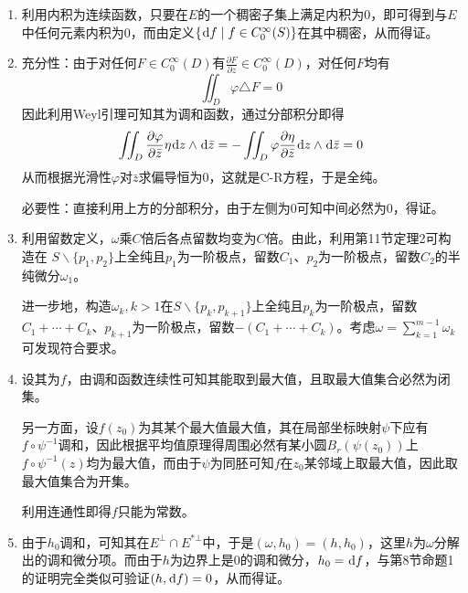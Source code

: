 \documentclass[a4paper,UTF8,fontset=windows,10pt]{ctexart}
\newcommand*{\dr}{\hspace{0.07em}\mathrm{d}}
\begin{document}
\begin{enumerate}
    \item 利用内积为连续函数，只要在$E$的一个稠密子集上满足内积为0，即可得到与$E$中任何元素内积为0，而由定义$\{\dr f\mid f\in C_0^\infty(S)\}$在其中稠密，从而得证。

    \item 充分性：由于对任何$F\in C_0^\infty(D)$有$\frac{\partial F}{\partial z}\in C_0^\infty(D)$，对任何$F$均有
    $$\iint_D\varphi\triangle F=0$$
    因此利用Weyl引理可知其为调和函数，通过分部积分即得
    $$\iint_D\frac{\partial\varphi}{\partial\bar{z}}\eta\dr z\wedge\dr\bar{z}=-\iint_D\varphi\frac{\partial\eta}{\partial\bar{z}}\dr z\wedge\dr\bar{z}=0$$
    从而根据光滑性$\varphi$对$\bar{z}$求偏导恒为0，这就是C-R方程，于是全纯。

    必要性：直接利用上方的分部积分，由于左侧为0可知中间必然为0，得证。
    

    \item 利用留数定义，$\omega$乘$C$倍后各点留数均变为$C$倍。由此，利用第11节定理2可构造在
    $S\backslash\{p_1,p_2\}$上全纯且$p_1$为一阶极点，留数$C_1$、$p_2$为一阶极点，留数$C_2$的半纯微分$\omega_1$。

    进一步地，构造$\omega_k,k>1$在$S\backslash\{p_k,p_{k+1}\}$上全纯且$p_k$为一阶极点，留数$C_1+\cdots+C_k$、$p_{k+1}$为一阶极点，留数$-(C_1+\cdots+C_k)$。考虑$\omega=\sum_{k=1}^{m-1}\omega_k$可发现符合要求。
    
    \item 设其为$f$，由调和函数连续性可知其能取到最大值，且取最大值集合必然为闭集。
    
    另一方面，设$f(z_0)$为其某个最大值最大值，其在局部坐标映射$\psi$下应有$f\circ\psi^{-1}$调和，因此根据平均值原理得周围必然有某小圆$B_r(\psi(z_0))$上$f\circ\psi^{-1}(z)$均为最大值，而由于$\psi$为同胚可知$f$在$z_0$某邻域上取最大值，因此取最大值集合为开集。
    
    利用连通性即得$f$只能为常数。

    \item 由于$h_0$调和，可知其在$E^\bot\cap E^{*\bot}$中，于是$(\omega,h_0)=(h,h_0)$，这里$h$为$\omega$分解出的调和微分项。而由于$h$为边界上是0的调和微分，$h_0=\dr f$，与第8节命题1的证明完全类似可验证$(h,\dr f)=0$，从而得证。
\end{enumerate}
\end{document}
